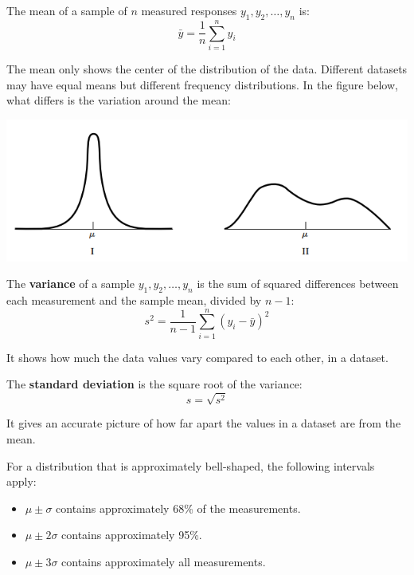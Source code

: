 \documentclass[12pt]{book}
\theoremstyle{definition}
\begin{document}
The mean of a sample of \( n \) measured responses \( y_1, y_2, \dots, y_n \) is:
\begin{equation}
    \bar{y} = \frac{1}{n} \sum_{i = 1}^{n} y_i
\end{equation}

The mean only shows the center of the distribution of the data. Different datasets may have equal means but different frequency distributions. In the figure below, what differs is the variation around the mean:
\begin{center}
    \includegraphics[scale=0.6]{../assets/distrib.png}
\end{center}

The \textbf{variance} of a sample \( y_1, y_2, \dots, y_n \) is the sum of squared differences between each measurement and the sample mean, divided by \( n - 1 \):
\begin{equation}
    s^2 = \frac{1}{n - 1} \sum_{i = 1}^{n} (y_i - \bar{y})^2
\end{equation}

It shows how much the data values vary compared to each other, in a dataset.

The \textbf{standard deviation} is the square root of the variance:
\begin{equation}
    s = \sqrt{s^2}
\end{equation}

It gives an accurate picture of how far apart the values in a dataset are from the mean.

For a distribution that is approximately bell-shaped, the following intervals apply:
\begin{itemize}
    \item \( \mu \pm \sigma \) contains approximately 68\% of the measurements.
    \item \( \mu \pm 2\sigma \) contains approximately 95\%.
    \item \( \mu \pm 3\sigma \) contains approximately all measurements.
\end{itemize}
\end{document}
